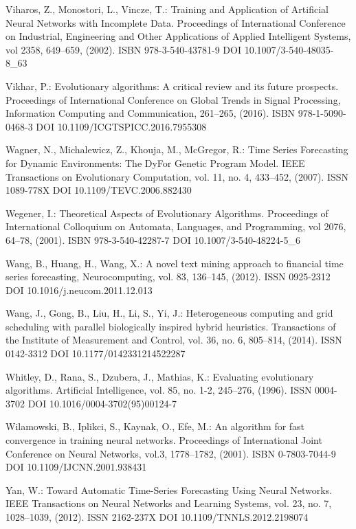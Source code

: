 \begin{thebibliography}{99.}
 Viharos, Z., Monostori, L., Vincze, T.: Training and Application of Artificial Neural Networks with Incomplete Data. Proceedings of International Conference on Industrial, Engineering and Other Applications of Applied Intelligent Systems, vol 2358, 649--659, (2002). ISBN 978-3-540-43781-9 DOI 10.1007/3-540-48035-8\_63

 Vikhar, P.: Evolutionary algorithms: A critical review and its future prospects. Proceedings of International Conference on Global Trends in Signal Processing, Information Computing and Communication, 261--265, (2016). ISBN 978-1-5090-0468-3 DOI 10.1109/ICGTSPICC.2016.7955308

 Wagner, N., Michalewicz, Z., Khouja, M., McGregor, R.: Time Series Forecasting for Dynamic Environments: The DyFor Genetic Program Model. IEEE Transactions on Evolutionary Computation, vol. 11, no. 4, 433--452, (2007). ISSN 1089-778X DOI 10.1109/TEVC.2006.882430

 Wegener, I.: Theoretical Aspects of Evolutionary Algorithms. Proceedings of International Colloquium on Automata, Languages, and Programming, vol 2076, 64--78, (2001). ISBN 978-3-540-42287-7 DOI 10.1007/3-540-48224-5\_6

 Wang, B., Huang, H., Wang, X.: A novel text mining approach to financial time series forecasting, Neurocomputing, vol. 83, 136--145, (2012). ISSN 0925-2312 DOI 10.1016/j.neucom.2011.12.013

 Wang, J., Gong, B., Liu, H., Li, S., Yi, J.: Heterogeneous computing and grid scheduling with parallel biologically inspired hybrid heuristics. Transactions of the Institute of Measurement and Control, vol. 36, no. 6, 805--814, (2014). ISSN 0142-3312 DOI 10.1177/0142331214522287

 Whitley, D., Rana, S., Dzubera, J., Mathias, K.: Evaluating evolutionary algorithms. Artificial Intelligence, vol. 85, no. 1-2, 245--276, (1996). ISSN 0004-3702 DOI 10.1016/0004-3702(95)00124-7

 Wilamowski, B., Iplikci, S., Kaynak, O., Efe, M.: An algorithm for fast convergence in training neural networks. Proceedings of International Joint Conference on Neural Networks, vol.3, 1778--1782, (2001). ISBN 0-7803-7044-9 DOI 10.1109/IJCNN.2001.938431

 Yan, W.: Toward Automatic Time-Series Forecasting Using Neural Networks. IEEE Transactions on Neural Networks and Learning Systems, vol. 23, no. 7, 1028--1039, (2012). ISSN 2162-237X DOI 10.1109/TNNLS.2012.2198074


\end{thebibliography}
